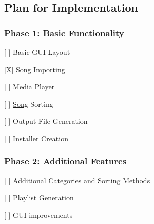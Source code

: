 \subsection*{Plan for Implementation}

\subsubsection*{Phase 1\+: Basic Functionality}


\begin{DoxyItemize}
\item \mbox{[} \mbox{]} Basic G\+UI Layout
\item \mbox{[}X\mbox{]} \mbox{\hyperlink{class_song}{Song}} Importing
\item \mbox{[} \mbox{]} Media Player
\item \mbox{[} \mbox{]} \mbox{\hyperlink{class_song}{Song}} Sorting
\item \mbox{[} \mbox{]} Output File Generation
\item \mbox{[} \mbox{]} Installer Creation \subsubsection*{Phase 2\+: Additional Features}
\end{DoxyItemize}


\begin{DoxyItemize}
\item \mbox{[} \mbox{]} Additional Categories and Sorting Methods
\item \mbox{[} \mbox{]} Playlist Generation
\item \mbox{[} \mbox{]} G\+UI improvements 
\end{DoxyItemize}